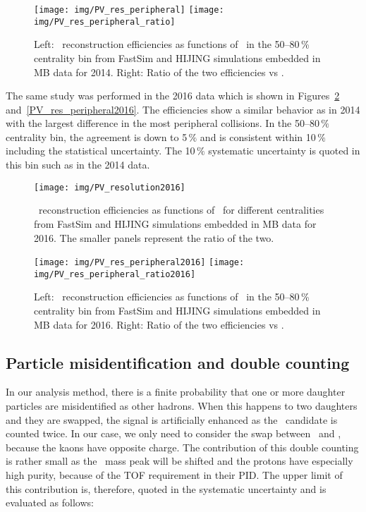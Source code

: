 \begin{figure}[!htb]
\centering
\texttt{[image: img/PV\_res\_peripheral]}
\texttt{[image: img/PV\_res\_peripheral\_ratio]}
\caption{\label{PV_peripheral} Left: \Lambdac\ reconstruction efficiencies as functions of \pt\ in the 50--80\,\% centrality bin from FastSim and HIJING simulations embedded in MB data for 2014. Right: Ratio of the two efficiencies vs \pt.}
\end{figure}

The same study was performed in the 2016 data which is shown in Figures~\ref{PV_resolution2016} and~\ref{PV_res_peripheral2016}\@. The efficiencies show a similar behavior as in 2014 with the largest difference in the most peripheral collisions. In the 50--80$\,\%$ centrality bin, the agreement is down to 5$\,\%$ and is consistent within 10$\,\%$ including the statistical uncertainty. The 10$\,\%$ systematic uncertainty is quoted in this bin such as in the 2014 data.

\begin{figure}[!htb]
\centering
\texttt{[image: img/PV\_resolution2016]}

\caption{\label{PV_resolution2016} \Lambdac\ reconstruction efficiencies as functions of \pt\ for different centralities from FastSim and HIJING simulations embedded in MB data for 2016. The smaller panels represent the ratio of the two.}
\end{figure}

\begin{figure}[!htb]
\centering
\texttt{[image: img/PV\_res\_peripheral2016]}
\texttt{[image: img/PV\_res\_peripheral\_ratio2016]}
\caption{\label{PV_peripheral2016} Left: \Lambdac\ reconstruction efficiencies as functions of \pt\ in the 50--80\,\% centrality bin from FastSim and HIJING simulations embedded in MB data for 2016. Right: Ratio of the two efficiencies vs \pt.}
\end{figure}


\subsection{Particle misidentification and double counting}
In our analysis method, there is a finite probability that one or more daughter particles are misidentified as other hadrons. When this happens to two daughters and they are swapped, the signal is artificially enhanced as the \Lambdac\ candidate is counted twice. In our case, we only need to consider the swap between \ppm\ and \pipm, because the kaons have opposite charge. The contribution of this double counting is rather small as the \Lambdac\ mass peak will be shifted and the protons have especially high purity, because of the TOF requirement in their PID\@. The upper limit of this contribution is, therefore, quoted in the systematic uncertainty and is evaluated as follows:

